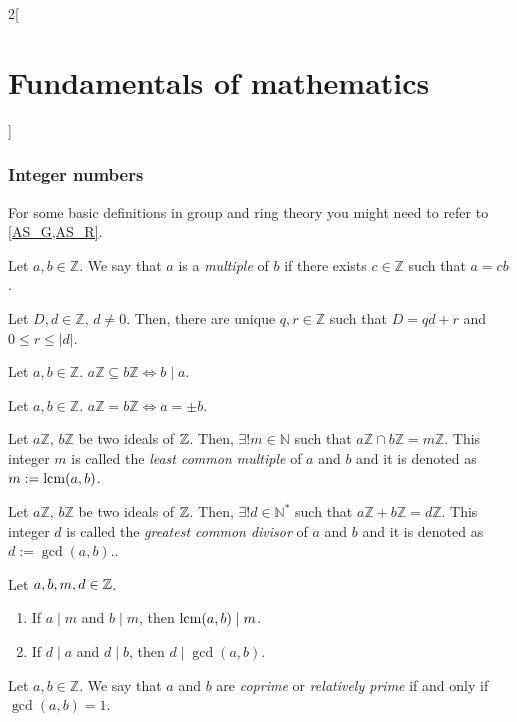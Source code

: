 \documentclass[../../../main.tex]{subfiles}
\begin{document}
\begin{multicols}{2}[\section{Fundamentals of mathematics}]
  \subsubsection{Integer numbers}
  For some basic definitions in group and ring theory you might need to refer to \cref{AS_G,AS_R}.
  \begin{definition}
    Let $a,b\in\mathbb{Z}$. We say that $a$ is a \emph{multiple} of $b$ if there exists $c\in\mathbb{Z}$ such that $a=cb$.
  \end{definition}
  \begin{theorem}
    Let $D,d\in\mathbb{Z}$, $d\ne 0$. Then, there are unique $q,r\in\mathbb{Z}$ such that $D=qd+r$ and $0\leq r\leq|d|$.
  \end{theorem}
  \begin{prop}
    Let $a,b\in \mathbb{Z}$. $a\mathbb{Z}\subseteq b\mathbb{Z}\iff b\mid a$.
  \end{prop}
  \begin{corollary}
    Let $a,b\in \mathbb{Z}$. $a\mathbb{Z}=b\mathbb{Z}\iff a=\pm b$.
  \end{corollary}
  \begin{prop}
    Let $a\mathbb{Z}$, $b\mathbb{Z}$ be two ideals of $\mathbb{Z}$. Then, $\exists!m\in\mathbb{N}$ such that $a\mathbb{Z}\cap b\mathbb{Z}=m\mathbb{Z}$. This integer $m$ is called the \emph{least common multiple} of $a$ and $b$ and it is denoted as $m:=\operatorname{lcm}(a,b)$.
  \end{prop}
  \begin{prop}
    Let $a\mathbb{Z}$, $b\mathbb{Z}$ be two ideals of $\mathbb{Z}$. Then, $\exists!d\in\mathbb{N}^*$ such that $a\mathbb{Z}+b\mathbb{Z}=d\mathbb{Z}$. This integer $d$ is called the \emph{greatest common divisor} of $a$ and $b$ and it is denoted as $d:=\gcd(a,b)$..
  \end{prop}
  \begin{prop}
    Let $a,b,m,d\in\mathbb{Z}$.
    \begin{enumerate}
      \item If $a\mid m$ and $b\mid m$, then $\operatorname{lcm}(a,b)\mid m$.
      \item If $d\mid a$ and $d\mid b$, then $d\mid\gcd(a,b)$.
    \end{enumerate}
  \end{prop}
  \begin{definition}
    Let $a,b\in\mathbb{Z}$. We say that $a$ and $b$ are \emph{coprime} or \emph{relatively prime} if and only if $\gcd(a,b)=1$.
  \end{definition}
  \begin{definition}

\end{definition}
\end{multicols}
\end{document}
